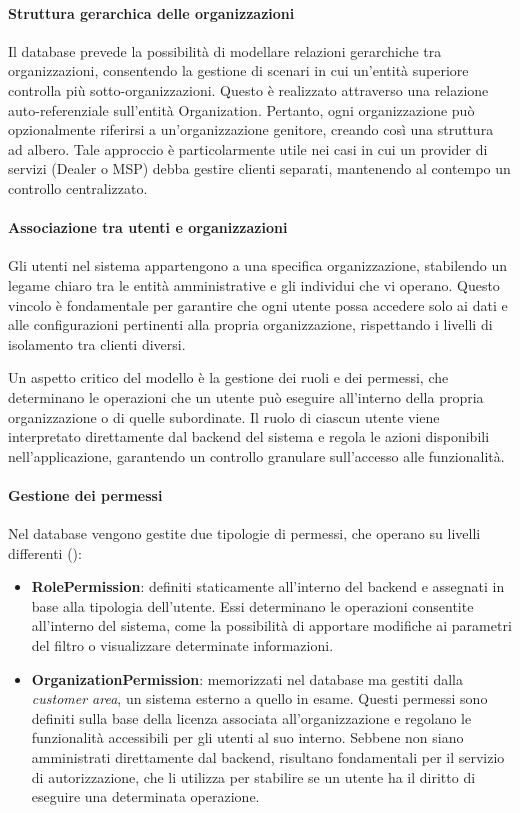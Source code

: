 \paragraph{Struttura gerarchica delle organizzazioni}
Il database prevede la possibilità di modellare relazioni gerarchiche tra organizzazioni, consentendo la gestione di scenari in cui un'entità superiore controlla più sotto-organizzazioni. Questo è realizzato attraverso una relazione auto-referenziale sull'entità Organization. Pertanto, ogni organizzazione può opzionalmente riferirsi a un'organizzazione genitore, creando così una struttura ad albero. Tale approccio è particolarmente utile nei casi in cui un provider di servizi (Dealer o MSP) debba gestire clienti separati, mantenendo al contempo un controllo centralizzato.

\paragraph{Associazione tra utenti e organizzazioni}
Gli utenti nel sistema appartengono a una specifica organizzazione, stabilendo un legame chiaro tra le entità amministrative e gli individui che vi operano. Questo vincolo è fondamentale per garantire che ogni utente possa accedere solo ai dati e alle configurazioni pertinenti alla propria organizzazione, rispettando i livelli di isolamento tra clienti diversi.

Un aspetto critico del modello è la gestione dei ruoli e dei permessi, che determinano le operazioni che un utente può eseguire all’interno della propria organizzazione o di quelle subordinate. Il ruolo di ciascun utente viene interpretato direttamente dal backend del sistema e regola le azioni disponibili nell’applicazione, garantendo un controllo granulare sull’accesso alle funzionalità.

\paragraph{Gestione dei permessi}
Nel database vengono gestite due tipologie di permessi, che operano su livelli differenti ():
\begin{itemize}
  \item \textbf{RolePermission}: definiti staticamente all'interno del backend e assegnati in base alla tipologia dell’utente. Essi determinano le operazioni consentite all’interno del sistema, come la possibilità di apportare modifiche ai parametri del filtro o visualizzare determinate informazioni.
  \item \textbf{OrganizationPermission}: memorizzati nel database ma gestiti dalla \textit{customer area}, un sistema esterno a quello in esame. Questi permessi sono definiti sulla base della licenza associata all'organizzazione e regolano le funzionalità accessibili per gli utenti al suo interno. Sebbene non siano amministrati direttamente dal backend, risultano fondamentali per il servizio di autorizzazione, che li utilizza per stabilire se un utente ha il diritto di eseguire una determinata operazione.
\end{itemize}

